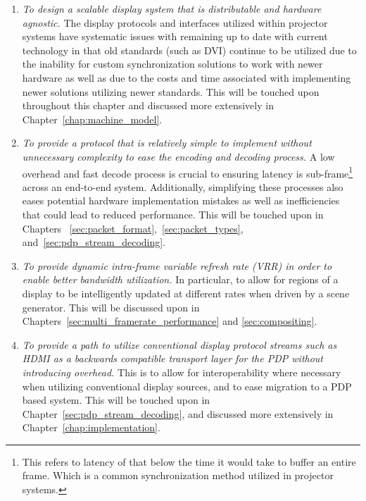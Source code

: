     \begin{enumerate}
        \item {\em To design a scalable display system that is distributable and hardware agnostic.} The display protocols and interfaces utilized within projector systems have systematic issues with remaining up to date with current technology in that old standards (such as DVI) continue to be utilized due to the inability for custom synchronization solutions to work with newer hardware as well as due to the costs and time associated with implementing newer solutions utilizing newer standards. This will be touched upon throughout this chapter and discussed more extensively in Chapter~\ref{chap:machine_model}.
        \item {\em To provide a protocol that is relatively simple to implement without unnecessary complexity to ease the encoding and decoding process.} A low overhead and fast decode process is crucial to ensuring latency is sub-frame\footnote{This refers to latency of that below the time it would take to buffer an entire frame. Which is a common synchronization method utilized in projector systems.} across an end-to-end system. Additionally, simplifying these processes also eases potential hardware implementation mistakes as well as inefficiencies that could lead to reduced performance. This will be touched upon in Chapters~ \ref{sec:packet_format},~\ref{sec:packet_types}, and~\ref{sec:pdp_stream_decoding}.
        \item {\em To provide dynamic intra-frame variable refresh rate (VRR) in order to enable better bandwidth utilization.} In particular, to allow for regions of a display to be intelligently updated at different rates when driven by a scene generator. This will be discussed upon in Chapters~\ref{sec:multi_framerate_performance} and \ref{sec:compositing}.
        \item {\em To provide a path to utilize conventional display protocol streams such as HDMI as a backwards compatible transport layer for the PDP without introducing overhead.} This is to allow for interoperability where necessary when utilizing conventional display sources, and to ease migration to a PDP based system. This will be touched upon in Chapter~\ref{sec:pdp_stream_decoding}, and discussed more extensively in Chapter~\ref{chap:implementation}.
    \end{enumerate}

